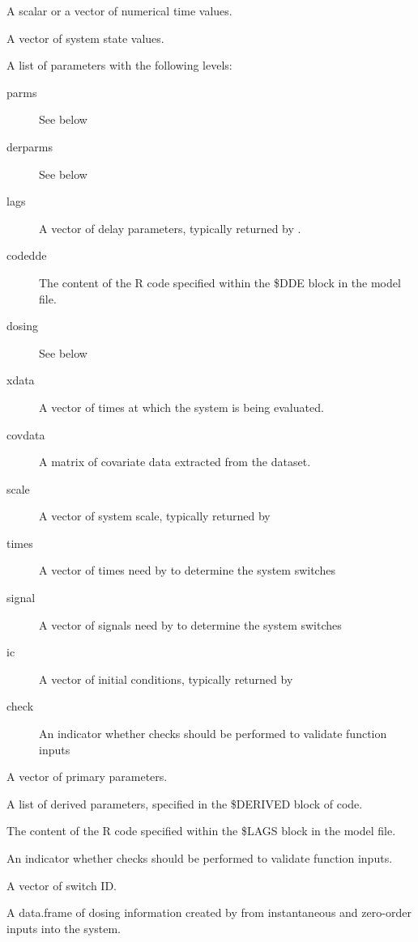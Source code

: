 \begin{Arguments}
\begin{ldescription}
\item[\code{t}] A scalar or a vector of numerical time values.
\item[\code{y}] A vector of system state values.
\item[\code{dde.parms}] A list of parameters with the following levels:
\begin{description}

\item[parms] See below
\item[derparms] See below
\item[lags] A vector of delay parameters, typically returned by 
.
\item[codedde] The content of the R code specified within the \$DDE block 
in the model file.
\item[dosing] See below
\item[xdata] A vector of times at which the system is being evaluated.
\item[covdata] A matrix of covariate data extracted from the dataset.
\item[scale] A vector of system scale, typically returned by 
\item[times] A vector of times need by  to determine
the system switches
\item[signal] A vector of signals need by  to determine
the system switches
\item[ic] A vector of initial conditions, typically returned by 
\item[check] An indicator whether checks should be performed to validate 
function inputs

\end{description}


\item[\code{parms}] A vector of primary parameters.
\item[\code{derparms}] A list of derived parameters, specified in the \$DERIVED block
of code.
\item[\code{codelags}] The content of the R code specified within the \$LAGS block in
the model file.
\item[\code{check}] An indicator whether checks should be performed to validate 
function inputs.
\item[\code{swID}] A vector of switch ID.
\item[\code{dosing}] A data.frame of dosing information created by 
from instantaneous and zero-order inputs into the system.
\end{ldescription}
\end{Arguments}
